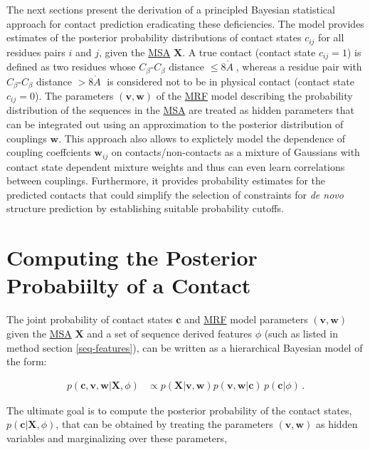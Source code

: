 \documentclass[11pt,a4paper,twoside]{book}
\newcommand{\Cb}{C_\beta}
\newcommand{\eq}{\!=\!}
\renewcommand{\c}{\mathbf{c}}
\newcommand{\cij}{c_{ij}}
\renewcommand{\v}{\mathbf{v}}
\newcommand{\w}{\mathbf{w}}
\newcommand{\wij}{\mathbf{w}_{ij}}
\newcommand{\X}{\mathbf{X}}
\newcommand{\angstrom}{\mathring{A} \;}
\theoremstyle{definition}
\theoremstyle{definition}
\theoremstyle{remark}
\begin{document}
The next sections present the derivation of a principled Bayesian
statistical approach for contact prediction eradicating these
deficiencies. The model provides estimates of the posterior probability
distributions of contact states \(\cij\) for all residues pairs \(i\)
and \(j\), given the \protect\hyperlink{abbrev}{MSA} \(\X\). A true
contact (contact state \(\cij\eq1\)) is defined as two residues whose
\(\Cb\)-\(\Cb\) distance \(\le 8 \angstrom\), whereas a residue pair
with \(\Cb\)-\(\Cb\) distance \(>8 \angstrom\) is considered not to be
in physical contact (contact state \(\cij\eq0\)). The parameters
\((\v, \w)\) of the \protect\hyperlink{abbrev}{MRF} model describing the
probability distribution of the sequences in the
\protect\hyperlink{abbrev}{MSA} are treated as hidden parameters that
can be integrated out using an approximation to the posterior
distribution of couplings \(\w\). This approach also allows to
explictely model the dependence of coupling coeffcients \(\wij\) on
contacts/non-contacts as a mixture of Gaussians with contact state
dependent mixture weights and thus can even learn correlations between
couplings. Furthermore, it provides probability estimates for the
predicted contacts that could simplify the selection of constraints for
\emph{de novo} structure prediction by establishing suitable probability
cutoffs.

\section{Computing the Posterior Probabiilty of a
Contact}\label{overview-posterior-distances}

The joint probability of contact states \(\c\) and
\protect\hyperlink{abbrev}{MRF} model parameters \((\v, \w)\) given the
\protect\hyperlink{abbrev}{MSA} \(\X\) and a set of sequence derived
features \(\phi\) (such as listed in method section \ref{seq-features}),
can be written as a hierarchical Bayesian model of the form:

\begin{align}
        p(\c, \v, \w | \X, \phi) &\propto p(\X | \v, \w) p(\v, \w | \c) \, p(\c | \phi ) \, .
\label{eq:hierarchical-bayesian-model}
\end{align}

The ultimate goal is to compute the posterior probability of the contact
states, \(p(\c | \X, \phi)\), that can be obtained by treating the
parameters \((\v, \w)\) as hidden variables and marginalizing over these
parameters,
\end{document}
